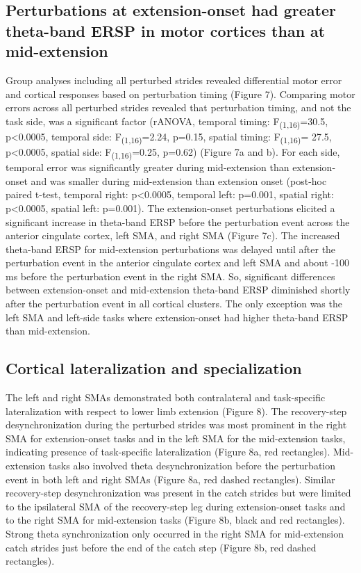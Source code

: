 \documentclass[shortpaper,twoside,web]{ieeecolor}
\newcommand{\tsu}[1]{\textsubscript{#1}}
\begin{document}
\subsection{Perturbations at extension-onset had greater theta-band ERSP in motor cortices than at mid-extension}
Group analyses including all perturbed strides revealed differential motor error and cortical responses based on perturbation timing (Figure 7). Comparing motor errors across all perturbed strides revealed that perturbation timing, and not the task side, was a significant factor (rANOVA, temporal timing: F\tsu{(1,16)}=30.5, p<0.0005, temporal side: F\tsu{(1,16)}=2.24, p=0.15, spatial timing: F\tsu{(1,16)}= 27.5, p<0.0005, spatial side: F\tsu{(1,16)}=0.25, p=0.62) (Figure 7a and b). For each side, temporal error was significantly greater during mid-extension than extension-onset and was smaller during mid-extension than extension onset (post-hoc paired t-test, temporal right: p<0.0005, temporal left: p=0.001, spatial right: p<0.0005, spatial left: p=0.001). The extension-onset perturbations elicited a significant increase in theta-band ERSP before the perturbation event across the anterior cingulate cortex, left SMA, and right SMA (Figure 7c). The increased theta-band ERSP for mid-extension perturbations was delayed until after the perturbation event in the anterior cingulate cortex and left SMA and about -100 ms before the perturbation event in the right SMA. So, significant differences between extension-onset and mid-extension theta-band ERSP diminished shortly after the perturbation event in all cortical clusters. The only exception was the left SMA and left-side tasks where extension-onset had higher theta-band ERSP than mid-extension.

\subsection{Cortical lateralization and specialization}
The left and right SMAs demonstrated both contralateral and task-specific lateralization with respect to lower limb extension (Figure 8). The recovery-step desynchronization during the perturbed strides was most prominent in the right SMA for extension-onset tasks and in the left SMA for the mid-extension tasks, indicating presence of task-specific lateralization (Figure 8a, red rectangles). Mid-extension tasks also involved theta desynchronization before the perturbation event in both left and right SMAs (Figure 8a, red dashed rectangles). Similar recovery-step desynchronization was present in the catch strides but were limited to the ipsilateral SMA of the recovery-step leg during extension-onset tasks and to the right SMA for mid-extension tasks (Figure 8b, black and red rectangles). Strong theta synchronization only occurred in the right SMA for mid-extension catch strides just before the end of the catch step (Figure 8b, red dashed rectangles).
\end{document}
